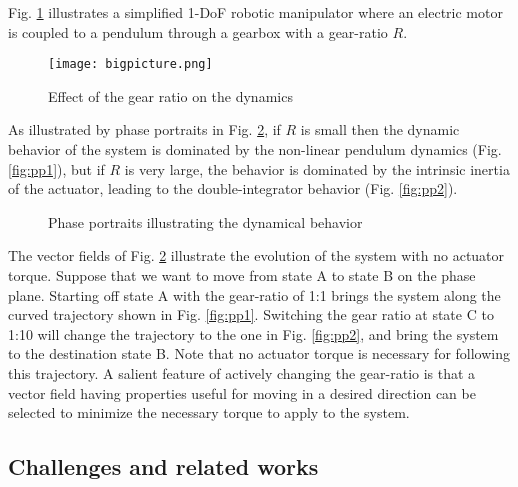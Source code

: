 Fig. \ref{fig:bigpicture} illustrates a simplified 1-DoF robotic manipulator where an electric motor is coupled to a pendulum through a gearbox with a gear-ratio $R$.

\begin{figure}[H]
 \vspace{-10pt}
	\centering
		\texttt{[image: bigpicture.png]}
	\caption{Effect of the gear ratio on the dynamics}
	\vspace{-10pt}
	\label{fig:bigpicture}
\end{figure}

As illustrated by phase portraits in Fig. \ref{fig:pp}, if $R$ is small then the dynamic behavior of the system is dominated by the non-linear pendulum dynamics (Fig. \ref{fig:pp1}), but if $R$ is very large, the behavior is dominated by the intrinsic inertia of the actuator, leading to the double-integrator behavior (Fig. \ref{fig:pp2}).

\begin{figure}[H]
				\vspace{-10pt}
        \centering
        \caption{Phase portraits illustrating the dynamical behavior}
				\label{fig:pp}
\end{figure}

The vector fields of Fig. \ref{fig:pp} illustrate the evolution of the system with no actuator torque. Suppose that we want to move from state A to state B on the phase plane. Starting off state A with the gear-ratio of 1:1 brings the system along the curved trajectory shown in Fig. \ref{fig:pp1}. Switching the gear ratio at state C to 1:10 will change the trajectory to the one in Fig. \ref{fig:pp2}, and bring the system to the destination state B. Note that no actuator torque is necessary for following this trajectory. A salient feature of actively changing the gear-ratio is that a vector field having properties useful for moving in a desired direction can be selected to minimize the necessary torque to apply to the system. 


\subsection{Challenges and related works}
\label{sec:chal}

